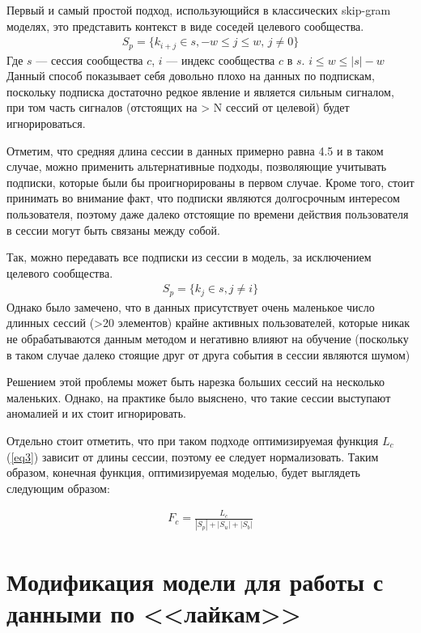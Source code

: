 \documentclass[times,specification,annotation]{itmo-student-thesis}
\begin{document}
Первый и самый простой подход, использующийся в классических skip-gram моделях, это представить контекст в виде соседей целевого сообщества. 
\begin{align}
S_p =\{k_{i + j} \in s, -w \leq j \leq w,\, j \ne 0\} \label{eq4}
\end{align}
Где $s$ --- сессия сообщества $c$, $i$ --- индекс сообщества $c$ в $s$. $i \leq w \leq |s| - w$
Данный
способ показывает себя довольно плохо на данных по подпискам, поскольку подписка
достаточно редкое явление и является сильным сигналом, при том часть сигналов
(отстоящих на > N сессий от целевой) будет игнорироваться.

Отметим, что средняя длина сессии в данных примерно равна 4.5 и в таком случае, можно применить альтернативные подходы, позволяющие учитывать подписки, которые были бы проигнорированы в первом случае. Кроме того, стоит принимать во внимание факт, что подписки являются долгосрочным интересом пользователя, поэтому даже далеко отстоящие по времени действия пользователя в сессии могут быть связаны между собой.

Так, можно передавать все подписки из сессии в модель, за исключением целевого сообщества.
\begin{align}
S_p =\{k_j \in s, j \ne i\} \label{eq5}
\end{align}
Однако было замечено, что в данных присутствует очень маленькое число длинных сессий (>20 элементов) крайне активных пользователей, которые никак не обрабатываются данным методом и негативно
влияют на обучение (поскольку в таком случае далеко стоящие друг от друга
события в сессии являются шумом)

Решением этой проблемы может быть нарезка больших
сессий на несколько маленьких. Однако, на практике было выяснено, что такие сессии выступают аномалией и их стоит игнорировать. 

Отдельно стоит отметить, что при таком подходе оптимизируемая функция $L_c$ (\ref{eq3}) зависит от длины сессии, поэтому ее следует нормализовать. Таким образом, конечная функция, оптимизируемая моделью, будет выглядеть следующим образом: 

\begin{align}
F_c = \frac{L_c}{|S_p| + |S_u| + |S_b|} \label{eq6}
\end{align}

\section{Модификация модели для работы с данными по <<лайкам>>}\label{sec:datal}
\end{document}

